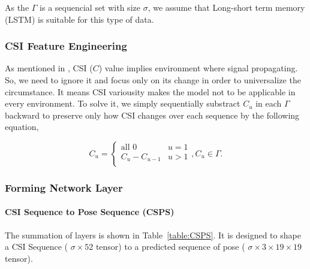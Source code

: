 \documentclass[10pt,letterpaper]{article}
\begin{document}
	
	As the $\Gamma$ is a sequencial set with size $\sigma$, we assume that Long-short term memory (LSTM) \cite{hochreiterS} is suitable for this type of data.
	

	
	\subsubsection*{CSI Feature Engineering}
	As mentioned in , CSI ($C$) value implies environment where signal propagating. So, we need to ignore it and focus only on its change in order to universalize the circumstance. It means CSI variousity makes the model not to be applicable in every environment. To solve it, we simply sequentially substract $C_u$  in each $\Gamma$ backward to preserve only how CSI changes over each sequence by the following equation,
	
	
	\begin{equation}
	C_u =  \begin{cases}
	\text{all } 0 &\text{$u = 1$}\\
	C_u - C_{u-1} &\text{$u > 1 $}\\
	\end{cases}, C_u \in \Gamma.
	\label{eq:CSIFeatureEn}
	\end{equation}
	
	\subsubsection*{Forming Network Layer}
	
	\paragraph*{CSI Sequence to Pose Sequence (CSPS)}
	
	The summation of layers is shown in Table~\ref{table:CSPS}.
	It is designed to shape a CSI Sequence ( $\sigma \times 52$ tensor) to a predicted sequence of pose ( $\sigma \times 3\times 19\times 19$ tensor).
	
\end{document}
